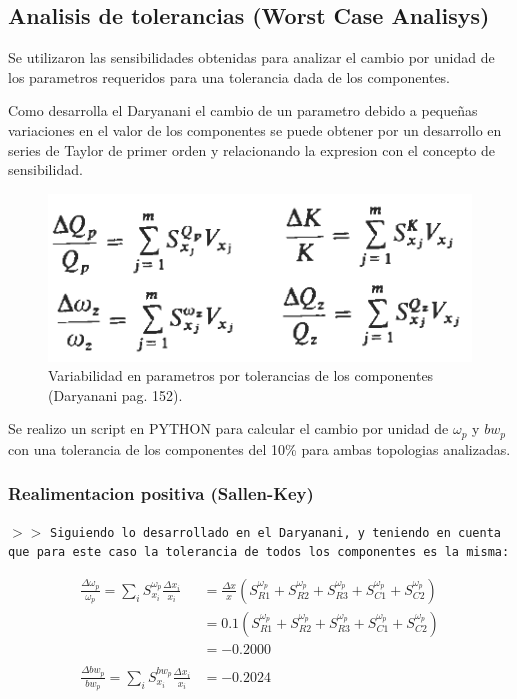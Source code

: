 \subsection{Analisis de tolerancias (Worst Case Analisys)}

Se utilizaron las sensibilidades obtenidas para analizar el cambio por unidad de los parametros requeridos para una tolerancia dada de los componentes.

Como desarrolla el Daryanani el cambio de un parametro debido a pequeñas variaciones en el valor de los componentes se puede obtener por un desarrollo en series de Taylor de primer orden y relacionando la expresion con el concepto de sensibilidad.

\begin{figure}[H]
    \centering
    \includegraphics[scale=.5]{Secciones/Circ1/img/desvPorUnidad.png}
    \caption{Variabilidad en parametros por tolerancias de los componentes (Daryanani pag. 152).}
    \label{prop}
\end{figure}

Se realizo un script en PYTHON para calcular el cambio por unidad de $\omega_{p}$ y $bw_p$ con una tolerancia de los componentes del 10\% para ambas topologias analizadas.

\subsubsection{Realimentacion positiva (Sallen-Key)}

\noindent $>>$ \texttt{Siguiendo lo desarrollado en el Daryanani, y teniendo en cuenta que para este caso la tolerancia de todos los componentes es la misma:}

\begin{align*}
    \frac{\Delta\omega_{p}}{\omega_{p}} 
    = \sum_{i} S^{\omega_p}_{x_i} \frac{\Delta x_{i}}{x_{i}} 
    &= \frac{\Delta x}{x} (S^{\omega_{p}}_{R1}+S^{\omega_{p}}_{R2}+S^{\omega_{p}}_{R3}+S^{\omega_{p}}_{C1}+S^{\omega_{p}}_{C2}) \\ 
    &= 0.1 (S^{\omega_{p}}_{R1}+S^{\omega_{p}}_{R2}+S^{\omega_{p}}_{R3}+S^{\omega_{p}}_{C1}+S^{\omega_{p}}_{C2}) \\
    &= -0.2000 \\\\
    \frac{\Delta bw_{p}}{bw_{p}} 
    = \sum_{i} S^{bw_p}_{x_i} \frac{\Delta x_{i}}{x_{i}} 
    &= -0.2024
\end{align*}

